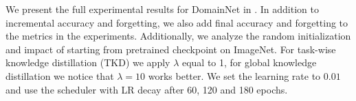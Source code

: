 \begin{appendix}
We present the full experimental results for DomainNet in . In addition to incremental accuracy and forgetting, we also add final accuracy and forgetting to the metrics in the experiments. Additionally, we analyze the random initialization and impact of starting from pretrained checkpoint on ImageNet. For task-wise knowledge distillation (TKD) we apply $\lambda$ equal to 1, for global knowledge distillation we notice that $\lambda = 10$ works better. We set the learning rate to $0.01$ and use the scheduler with LR decay after 60, 120 and 180 epochs.

\end{appendix}